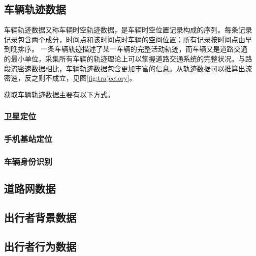 \subsection{车辆轨迹数据}
车辆轨迹数据又称车辆时空轨迹数据，是车辆时空位置记录构成的序列。每条记录记录包含两个成分，时间点和该时间点时车辆的空间位置；所有记录按时间点由早到晚排序。
一条车辆轨迹描述了某一车辆的完整活动轨迹，而车辆又是道路交通的最小单位，采集所有车辆的轨迹理论上可以掌握道路交通系统的完整状况。与路段流密速数据相比，车辆轨迹数据包含更加丰富的信息。从轨迹数据可以推算出流密速，反之则不成立，见图\ref{fig:trajectory}。

获取车辆轨迹数据主要有以下方式。
\subsubsection{卫星定位}

\subsubsection{手机基站定位}

\subsubsection{车辆身份识别}
\subsection{道路网数据}

\subsection{出行者背景数据}

\subsection{出行者行为数据}
